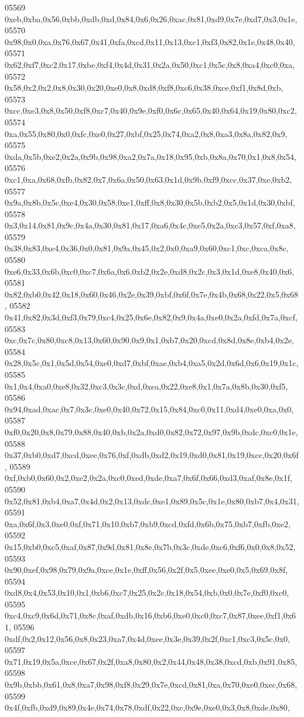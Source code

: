 \begin{DoxyCode}
05569   0xeb,0xba,0x56,0xbb,0xdb,0xd,0x84,0x6,0x26,0xac,0x81,0xd9,0x7e,0xd7,0x3,0x1e,
05570   0x98,0x0,0xa,0x76,0x67,0x41,0xfa,0xcd,0x11,0x13,0xc1,0xf3,0x82,0x1e,0x48,0x40,
05571   0x62,0xf7,0xc2,0x17,0xbe,0xf4,0x4d,0x31,0x2a,0x50,0xc1,0x5c,0x8,0xa4,0xc0,0xa,
05572   0x58,0x2,0x2,0x8,0x30,0x20,0xe0,0x8,0xd8,0xf8,0xc6,0x38,0xce,0xf1,0x8d,0xb,
05573   0xcc,0xe3,0x8,0x50,0xf8,0xc7,0x40,0x9e,0xf0,0x6c,0x65,0x40,0x64,0x19,0x80,0xc2,
05574   0xa,0x55,0x80,0x0,0xfc,0xe0,0x27,0xbf,0x25,0x74,0xa2,0x8,0xa3,0x8a,0x82,0x9,
05575   0xda,0x5b,0xe2,0x2a,0x9b,0x98,0xa2,0x7a,0x18,0x95,0xb,0x8a,0x70,0x1,0x8,0x54,
05576   0xc1,0xa,0x68,0xfb,0x82,0x7,0x6a,0x50,0x63,0x1d,0x9b,0xf9,0xcc,0x37,0xe,0xb2,
05577   0x9a,0x8b,0x5c,0xe4,0x30,0x58,0xe1,0xff,0x8,0x30,0x5b,0xb2,0x5,0x1d,0x30,0xbf,
05578   0x3,0x14,0x81,0x9c,0x4a,0x30,0x81,0x17,0xa6,0x4c,0xe5,0x2a,0xc3,0x57,0xf,0xa8,
05579   0x38,0x83,0xe4,0x36,0x0,0x81,0x9a,0x45,0x2,0x0,0xa9,0x60,0xc1,0xc,0xca,0x8c,
05580   0xe6,0x33,0x6b,0xc0,0xc7,0x6a,0x6,0xb2,0x2e,0xd8,0x2c,0x3,0x1d,0xe8,0x40,0x6,
05581   0x82,0xb0,0x42,0x18,0x60,0x46,0x2e,0x39,0xbf,0x6f,0x7e,0x4b,0x68,0x22,0x5,0x68,
05582   0x41,0x82,0x3d,0xf3,0x79,0xc4,0x25,0x6e,0x82,0x9,0x4a,0xe0,0x2a,0xfd,0x7a,0xcf,
05583   0xc,0x7c,0x80,0xc8,0x13,0x60,0x90,0x9,0x1,0xb7,0x20,0xcd,0x8d,0x8e,0xb4,0x2e,
05584   0x28,0x5c,0x1,0x5d,0x54,0xe0,0xd7,0xbf,0xae,0xb4,0xa5,0x2d,0x6d,0x6,0x19,0x1c,
05585   0x1,0x4,0xa0,0xe8,0x32,0xc3,0x3c,0xd,0xea,0x22,0xe8,0x1,0x7a,0x8b,0x30,0xf5,
05586   0x94,0xad,0xac,0x7,0x3c,0xe0,0x40,0x72,0x15,0x84,0xc0,0x11,0xd4,0xe0,0xa,0x0,
05587   0xf0,0x20,0x8,0x79,0x88,0x40,0xb,0x2a,0xd0,0x82,0x72,0x97,0x9b,0xdc,0xc0,0x1e,
05588   0x37,0xb0,0xd7,0xcd,0xee,0x76,0xf,0xdb,0xd2,0x19,0xd0,0x81,0x19,0xcc,0x20,0x6f,
05589   0xf,0xb0,0x60,0x2,0xe2,0x2a,0xc0,0xed,0xde,0xa7,0x6f,0x66,0xd3,0xaf,0x8e,0x1f,
05590   0x52,0x81,0xb4,0xa7,0x4d,0x2,0x13,0xdc,0xe1,0x89,0x5c,0x1e,0x80,0xb7,0x4,0x31,
05591   0xa,0x6f,0x3,0xe0,0xf,0x71,0x10,0xb7,0xb9,0xcd,0xfd,0x6b,0x75,0xb7,0xfb,0xe2,
05592   0x15,0xb0,0xc5,0xaf,0x87,0x9d,0x81,0x8e,0x7b,0x3c,0xde,0xc6,0xf6,0x0,0x8,0x52,
05593   0x90,0xef,0x98,0x79,0x9a,0xce,0x1e,0xff,0x56,0x2f,0x5,0xee,0xe0,0x5,0x69,0x8f,
05594   0xd8,0x4,0x53,0x10,0x1,0xb6,0xc7,0x25,0x2c,0x18,0x54,0xb,0x0,0x7e,0xf0,0xc0,
05595   0xc4,0xc9,0x6d,0x71,0x8c,0xaf,0xdb,0x16,0xb6,0xe0,0xc0,0xc7,0x87,0xee,0xf1,0x61,
05596   0xdf,0x2,0x12,0x56,0x8,0x23,0xa7,0x4d,0xee,0x3e,0x39,0x2f,0xc1,0xc3,0x5c,0x0,
05597   0x71,0x19,0x5a,0xce,0x67,0x2f,0xa8,0x80,0x2,0x44,0x48,0x38,0xcd,0xb,0x91,0x85,
05598   0x9b,0xbb,0x61,0x8,0xa7,0x98,0xf8,0x29,0x7e,0xcd,0x81,0xa,0x70,0xe0,0xec,0x68,
05599   0x4f,0xfb,0xd9,0x89,0x4e,0x74,0x78,0xdf,0x22,0xc,0x9e,0xe0,0x3,0x8,0xde,0x80,

\end{DoxyCode}

